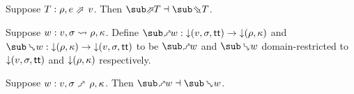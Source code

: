 \begin{theorem}
\label{thm:core-language:eval:gc}
   Suppose $T: \rho, e \evalFwdS v$.  Then $\evalFwdF{T} \adjoint \evalBwdF{T}$.
\end{theorem}

\begin{definition}
   Suppose $w: v, \sigma \rightsquigarrow \rho, \kappa$. Define $\matchFwdF{w}: \Below{(v,\sigma,\TT)} \to \Below{(\rho,\kappa)}$ and $\matchBwdF{w}: \Below{(\rho,\kappa)} \to \Below{(v,\sigma,\TT)}$ to be $\matchFwdR{w}$ and $\matchBwdR{w}$ domain-restricted to ${\downarrow}{(v,\sigma,\mathsf{tt})}$ and ${\downarrow}{(\rho,\kappa)}$ respectively.
\end{definition}

\begin{theorem}
\label{thm:core-language:match:gc}
   Suppose $w: v, \sigma \matchFwdS \rho, \kappa$.  Then $\matchFwdF{w} \adjoint \matchBwdF{w}$.
\end{theorem}

